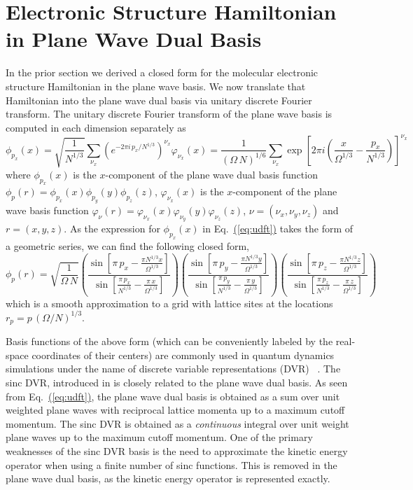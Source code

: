 \documentclass[superscriptaddress,aps,pra,nofootinbib,notitlepage,10pt,longbibliography]{revtex4-1}
\newcommand{\eq}[1]{Eq.~\hyperref[eq:#1]{(\ref*{eq:#1})}}
\begin{document}
\section{Electronic Structure Hamiltonian in Plane Wave Dual Basis}
\label{app:plane_wave_dual}

In the prior section we derived a closed form for the molecular electronic structure Hamiltonian in the plane wave basis. We now translate that Hamiltonian into the plane wave dual basis via unitary discrete Fourier transform. The unitary discrete Fourier transform of the plane wave basis is computed in each dimension separately as
\begin{equation}
\phi_{p_x}\left(x\right) = \sqrt{\frac{1}{N^{1/3}}} \sum_{\nu_x} \left(e^{-2\pi i \, p_x / N^{1/3}}\right)^{\nu_x} \varphi_{\nu_x} \left(x\right)
%
= \frac{1}{(\Omega \, N)^{1/6}} \sum_{\nu_x} \exp\left[2 \pi i \left(\frac{x}{\Omega^{1/3}}-\frac{p_x}{N^{1/3}} \right) \right]^{\nu_x}
\label{eq:udft}
\end{equation}
where $\phi_{p_x}(x)$ is the $x$-component of the plane wave dual basis function $\phi_p(r) = \phi_{p_x}(x)\phi_{p_y}(y)\phi_{p_z}(z)$, $\varphi_{\nu_x}(x)$ is the $x$-component of the plane wave basis function $\varphi_\nu(r) = \varphi_{\nu_x}(x)\varphi_{\nu_y}(y)\varphi_{\nu_z}(z)$, $\nu = (\nu_x, \nu_y, \nu_z)$ and $r = (x, y, z)$. As the expression for $\phi_{p_x} (x)$ in \eq{udft} takes the form of a geometric series, we can find the following closed form,
\begin{equation}
\phi_{p}\left(r\right) = \sqrt{\frac{1}{\Omega \, N}} \left(\frac{\sin \left[\pi \, p_x - \frac{\pi N^{1/3} x}{\Omega^{1/3}} \right]}{\sin\left[\frac{\pi \, p_x}{N^{1/3}} - \frac{\pi \, x}{\Omega^{1/3}}\right]}\right)
%
\left(\frac{\sin \left[\pi \, p_y - \frac{\pi N^{1/3} y}{\Omega^{1/3}} \right]}{\sin\left[\frac{\pi \, p_y}{N^{1/3}} - \frac{\pi \, y}{\Omega^{1/3}}\right]}\right)
%
\left(\frac{\sin \left[\pi \,p_z - \frac{\pi N^{1/3} z}{\Omega^{1/3}} \right]}{\sin\left[\frac{\pi \, p_z}{N^{1/3}} - \frac{\pi \, z}{\Omega^{1/3}}\right]}\right)
\label{eq:pwd_functions}
\end{equation}
which is a smooth approximation to a grid with lattice sites at the locations $r_p = p\, (\Omega / N)^{1/3}$.

Basis functions of the above form (which can be conveniently labeled by the real-space coordinates of their centers) are
commonly used in quantum dynamics simulations under the name of discrete variable representations (DVR) ~\cite{lill1982discrete,shizgal1984discrete,dvrreview,colbert1992novel,Jones2016}. The sinc DVR, introduced in \cite{colbert1992novel} is closely related to the plane wave dual basis. As seen from \eq{udft}, the plane wave dual basis is obtained as a sum over unit weighted plane waves with reciprocal lattice momenta up to a maximum cutoff momentum. The sinc DVR is obtained as a {\it continuous} integral over unit weight plane waves up to the maximum cutoff momentum. One of the primary weaknesses of the sinc DVR basis is the need to approximate the kinetic energy operator when using a finite number of sinc functions. This is removed in the plane wave dual basis, as the kinetic energy operator is represented exactly.
\end{document}
